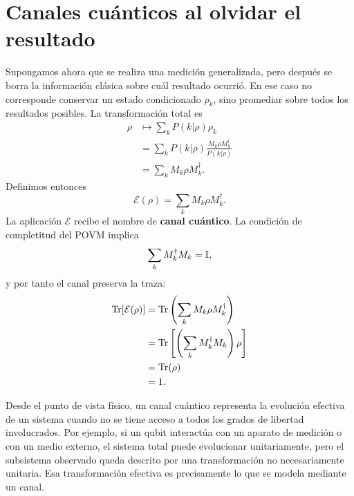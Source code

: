 \documentclass[../main.tex]{subfiles}
\begin{document}
\section{Canales cuánticos al olvidar el resultado}

Supongamos ahora que se realiza una medición generalizada, pero después se borra la información clásica sobre cuál resultado ocurrió. En ese caso no corresponde conservar un estado condicionado $\rho_k$, sino promediar sobre todos los resultados posibles. La transformación total es
\begin{align*}
    \rho
    &\longmapsto
    \sum_k P(k|\rho)\rho_k\\
    &=\sum_k P(k|\rho)
    \frac{M_k\rho M_k^\dagger}{P(k|\rho)}\\
    &=\sum_k M_k\rho M_k^\dagger.
\end{align*}
Definimos entonces
\begin{equation*}
    \mathcal{E}(\rho)=\sum_k M_k\rho M_k^\dagger.
\end{equation*}
La aplicación $\mathcal{E}$ recibe el nombre de \textbf{canal cuántico}. La condición de completitud del POVM implica
\begin{equation*}
    \sum_k M_k^\dagger M_k=\mathbb{I},
\end{equation*}
y por tanto el canal preserva la traza:
\begin{align*}
    \Tr[\mathcal{E}(\rho)]
    &=\Tr\left(\sum_kM_k\rho M_k^\dagger\right)\\
    &=\Tr\left[\left(\sum_kM_k^\dagger M_k\right)\rho\right]\\
    &=\Tr(\rho)\\
    &=1.
\end{align*}

Desde el punto de vista físico, un canal cuántico representa la evolución efectiva de un sistema cuando no se tiene acceso a todos los grados de libertad involucrados. Por ejemplo, si un qubit interactúa con un aparato de medición o con un medio externo, el sistema total puede evolucionar unitariamente, pero el subsistema observado queda descrito por una transformación no necesariamente unitaria. Esa transformación efectiva es precisamente lo que se modela mediante un canal.
\end{document}
